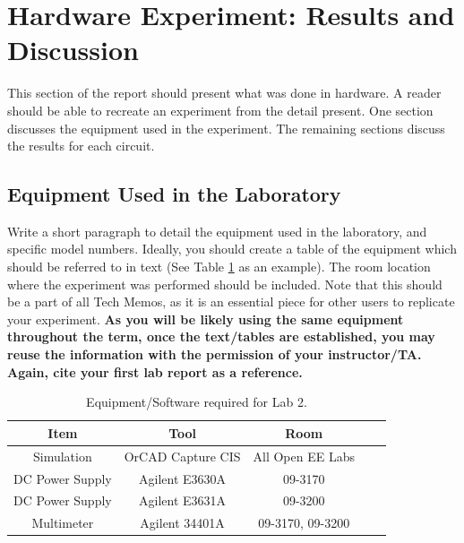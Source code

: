 \documentclass[11pt]{article}
\begin{document}
\section{Hardware Experiment: Results and Discussion}
This section of the report should present what was done in hardware.  A reader should be able to recreate an experiment from the detail present.  One section discusses the equipment used in the experiment. The remaining sections discuss the results for each circuit.
\subsection{Equipment Used in the Laboratory}
Write a short paragraph to detail the equipment used in the laboratory, and specific model numbers. Ideally, you should create a table of the equipment which should be referred to in text (See Table \ref{Table:Equipment} as an example).  The room location where the experiment was performed should be included.  Note that this should be a part of all Tech Memos, as it is an essential piece for other users to replicate your experiment.  \textbf{As you will be likely using the same equipment throughout the term, once the text/tables are established, you may reuse the information with the permission of your instructor/TA. Again, cite your first lab report as a reference.}
		
		\begin{table}[h!]
			\centering
			\caption{Equipment/Software required for Lab 2.}
			\label{Table:Equipment}
				\begin{tabular}{|c||c|c|c|c|}
					\hline
					Item & Tool & Room      \\
					\hline
					Simulation & OrCAD Capture CIS & All Open EE Labs   \\	 
					\hline 
					DC Power Supply&  Agilent E3630A  & 09-3170   \\	
					\hline  
					DC Power Supply & Agilent E3631A   & 09-3200 \\ 
					\hline 
					Multimeter & Agilent 34401A & 09-3170, 09-3200 \\
					\hline
				\end{tabular}
		\end{table}
\clearpage
\end{document}
